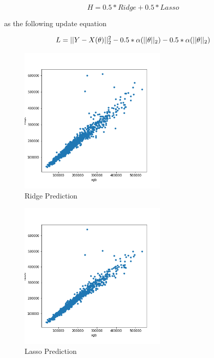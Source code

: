 \documentclass[11pt,a4paper]{article}
\begin{document}
\begin{equation}
    \label{eq: hybrid}
    H = 0.5*Ridge + 0.5*Lasso
\end{equation}

as the following update equation


\begin{equation}
\label{eq: lasso}
L = ||Y - X(\theta)||_2^2 - 0.5*\alpha(||\theta||_2)\\ - 0.5*\alpha(||\theta||_2)\\
\end{equation}


\begin{figure}
    \centering
    \includegraphics[width=7cm]{images/ridge.png}
    \caption{Ridge Prediction}
    \label{fig:ridge}
\end{figure}

\begin{figure}
    \centering
    \includegraphics[width=7cm]{images/lasso.png}
    \caption{Lasso Prediction}
    \label{fig:lasso}
\end{figure}
\end{document}
